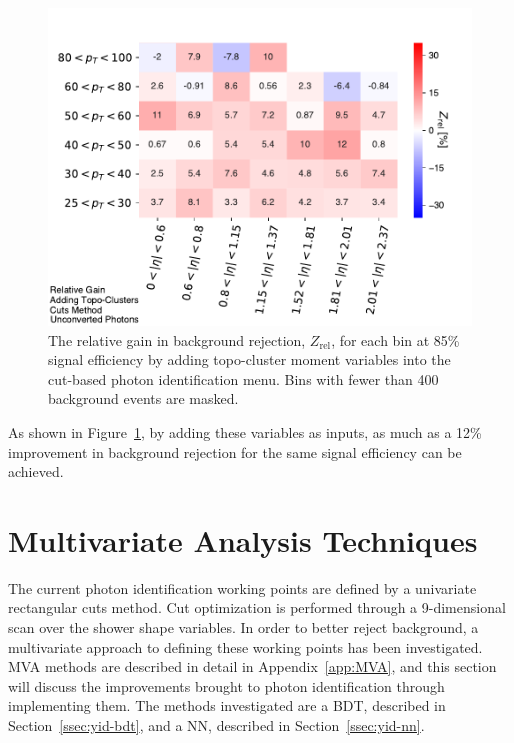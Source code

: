 \begin{figure}[!htbp]
    \centering
    \includegraphics[width=.85\textwidth]{chapters/chapter4_photonID/images/gain_topoAdded_unconverted.pdf}
    \caption[The relative gain in background rejection, $Z_{\text{rel}}$, for each \etaPt bin at 85\% signal efficiency by adding topo-cluster moment variables into the cut-based photon identification menu]{The relative gain in background rejection, $Z_{\text{rel}}$, for each \etaPt bin at 85\% signal efficiency by adding topo-cluster moment variables into the cut-based photon identification menu. Bins with fewer than 400 background events are masked.}
    \label{fig:gain-topo-clusters-added-unconverted}
\end{figure}
As shown in Figure~\ref{fig:gain-topo-clusters-added-unconverted}, by adding these variables as inputs, as much as a 12\% improvement in background rejection for the same signal efficiency can be achieved.

\section{Multivariate Analysis Techniques}\label{sec:mva-yid}

The current photon identification working points are defined by a univariate rectangular cuts method. Cut optimization is performed through a 9-dimensional scan over the shower shape variables. In order to better reject background, a multivariate approach to defining these working points has been investigated. \gls{MVA} methods are described in detail in Appendix~\ref{app:MVA}, and this section will discuss the improvements brought to photon identification through implementing them. The methods investigated are a \gls{BDT}, described in Section~\ref{ssec:yid-bdt}, and a \gls{NN}, described in Section~\ref{ssec:yid-nn}.


